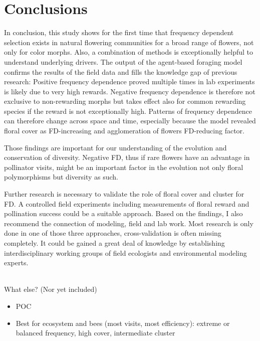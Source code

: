 \section{Conclusions}
\label{ch:conclusions}
In conclusion, this study shows for the first time that frequency dependent selection exists in natural flowering communities for a broad range of flowers, not only for color morphs. Also, a combination of methods is exceptionally helpful to understand underlying drivers. The output of the agent-based foraging model confirms the results of the field data and fills the knowledge gap of previous research: Positive frequency dependence proved multiple times in lab experiments is likely due to very high rewards. Negative frequency dependence is therefore not exclusive to non-rewarding morphs but takes effect also for common rewarding species if the reward is not exceptionally high. Patterns of frequency dependence can therefore change across space and time, especially because the model revealed floral cover as FD-increasing and agglomeration of flowers FD-reducing factor.

Those findings are important for our understanding of the evolution and conservation of diversity. Negative FD, thus if rare flowers have an advantage in pollinator visits, might be an important factor in the evolution not only floral polymorphisms but diversity as such. 

Further research is necessary to validate the role of floral cover and cluster for FD. A controlled field experiments including measurements of floral reward and pollination success could be a suitable approach. Based on the findings, I also recommend the connection of modeling, field and lab work. Most research is only done in one of those three approaches, cross-validation is often missing completely. It could be gained a great deal of knowledge by establishing interdisciplinary working groups of field ecologists and environmental modeling experts. 

\\

What else? (Nor yet included)
\begin{itemize}
	\item POC
	\item Best for ecosystem and bees (most visits, most efficiency): extreme or balanced frequency, high cover, intermediate cluster
\end{itemize}
